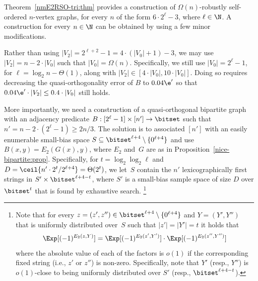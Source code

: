 %
\label{dense:rso:all-n's:rem}
Theorem~\ref{nmE2RSO-tri:thm} provides a construction
of $\Omega(n)$-robustly self-ordered $n$-vertex graphs,
for every $n$ of the form $6\cdot2^\ell-3$, where $\ell\in\N$.
A construction for every $n\in\N$ can be obtained
by using a few minor modifications.
\BI
\item
Rather than using $|V_2|=2^{\ell+2}-1=4\cdot(|V_0|+1)-3$,
we may use $|V_2|=n-2\cdot|V_0|$ such that $|V_0|=\Omega(n)$.
Specifically, we still use $|V_0|=2^\ell-1$,
for $\ell=\log_2n-\Theta(1)$,
along with $|V_2|\in[4\cdot|V_0|,10\cdot|V_0|]$.
Doing so requires decreasing the quasi-orthogonality error of $B$
to $0.04\e'$ so that $0.04\e'\cdot|V_2|\leq0.4\cdot|V_0|$ still holds.
\item
More importantly, we need a construction of a quasi-orthogonal bipartite
graph with an adjacency predicate $B:[2^\ell-1]\times[n']\to\bitset$
such that $n'=n-2\cdot(2^{\ell}-1)\geq 2n/3$.
The solution is to associated $[n']$ with an easily enumerable
small-bias space $S\subseteq\bitset^{\ell+4}\setminus\{0^{\ell+4}\}$
and use $B(x,y)=E_2(G(x),y)$, where $E_2$ and~$G$ are as
in Proposition~\ref{nice-bipartite:prop}.
Specifically, for $t=\log_2\log_2\ell$
and $D=\ceil{n'\cdot2^t/2^{\ell+4}}=\Theta(2^t)$,
we let~$S$ contain the $n'$ lexicographically first strings
in $S'\times\bitset^{\ell+4-t}$, where $S'$ is a small-bias sample
space of size $D$ over $\bitset^t$ that is found by exhaustive search.
%
\footnote{Note that
for every $z=(z',z'')\in\bitset^{\ell+4}\setminus\{0^{\ell+4}\}$
and $Y=(Y',Y'')$ that is uniformly distributed over~$S$
such that $|z'|=|Y'|=t$ it holds that
$$\Exp[(-1)^{E_2(z,Y)}]
 =\Exp[(-1)^{E_2(z',Y')}]\cdot\Exp[(-1)^{E_2(z'',Y'')}]$$
where the absolute value of each of the factors is $o(1)$ if
the corresponding fixed string (i.e., $z'$ or $z''$) is non-zero.
Specifically, note that $Y'$ (resp., $Y''$) is $o(1)$-close to
being uniformly distributed over $S'$ (resp., $\bitset^{\ell+4-t}$).}
%
%
%
%
%
%
%
\EI
\ER
%

